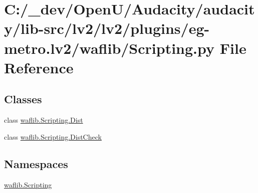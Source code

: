 \hypertarget{lv2_2plugins_2eg-metro_8lv2_2waflib_2_scripting_8py}{}\section{C\+:/\+\_\+dev/\+Open\+U/\+Audacity/audacity/lib-\/src/lv2/lv2/plugins/eg-\/metro.lv2/waflib/\+Scripting.py File Reference}
\label{lv2_2plugins_2eg-metro_8lv2_2waflib_2_scripting_8py}
\subsection*{Classes}
\begin{DoxyCompactItemize}
\item 
class \hyperlink{classwaflib_1_1_scripting_1_1_dist}{waflib.\+Scripting.\+Dist}
\item 
class \hyperlink{classwaflib_1_1_scripting_1_1_dist_check}{waflib.\+Scripting.\+Dist\+Check}
\end{DoxyCompactItemize}
\subsection*{Namespaces}
\begin{DoxyCompactItemize}
\item 
 \hyperlink{namespacewaflib_1_1_scripting}{waflib.\+Scripting}
\end{DoxyCompactItemize}
